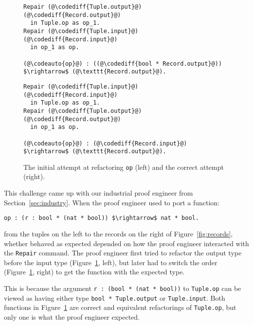 \begin{figure}
\begin{minipage}{0.54\textwidth}
\begin{lstlisting}
Repair (@\codediff{Tuple.output}@) (@\codediff{Record.output}@) 
  in Tuple.op as op_1.
Repair (@\codediff{Tuple.input}@) (@\codediff{Record.input}@)
  in op_1 as op.

(@\codeauto{op}@) : ((@\codediff{bool * Record.output}@)) $\rightarrow$ (@\texttt{Record.output}@).
\end{lstlisting}
\end{minipage}
\hfill
\begin{minipage}{0.44\textwidth}
\begin{lstlisting}
Repair (@\codediff{Tuple.input}@) (@\codediff{Record.input}@)
  in Tuple.op as op_1.
Repair (@\codediff{Tuple.output}@) (@\codediff{Record.output}@)
  in op_1 as op.

(@\codeauto{op}@) : (@\codediff{Record.input}@) $\rightarrow$ (@\texttt{Record.output}@).
\end{lstlisting}
\end{minipage}
\caption{The initial attempt at refactoring \lstinline{op} (left) and the correct attempt (right).}
\label{fig:op}
\end{figure}

This challenge came up with our industrial proof engineer from Section~\ref{sec:industry}. %
When the proof engineer used \toolname to port a function:

\begin{lstlisting}
op : (r : bool * (nat * bool)) $\rightarrow$ nat * bool.
\end{lstlisting}
from the tuples on the left to the records on the right of Figure~\ref{fig:records},
whether \toolname behaved as expected depended on how the proof engineer interacted with the \lstinline{Repair} command.
The proof engineer first tried to refactor the output type before the input type (Figure~\ref{fig:op}, left),
but later had to switch the order (Figure~\ref{fig:op}, right) to get the function with the expected type.

This is because the argument \lstinline{r : (bool * (nat * bool))} to \lstinline{Tuple.op} can be viewed as 
having either type \lstinline{bool * Tuple.output} or \lstinline{Tuple.input}.
Both functions in Figure~\ref{fig:op} are correct and equivalent refactorings of \lstinline{Tuple.op},
but only one is what the proof engineer expected.

